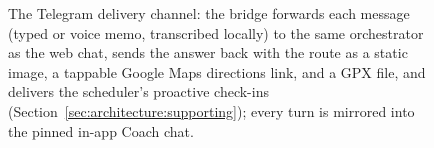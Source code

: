 \begin{figure}[ht]
\centering
{}
\caption[Telegram coach conversation]{The Telegram delivery channel: the bridge forwards each message (typed or voice memo, transcribed locally) to the same orchestrator as the web chat, sends the answer back with the route as a static image, a tappable Google Maps directions link, and a GPX file, and delivers the scheduler's proactive check-ins (Section~\ref{sec:architecture:supporting}); every turn is mirrored into the pinned in-app Coach chat.}\label{fig:screenshot_telegram}
\end{figure}
